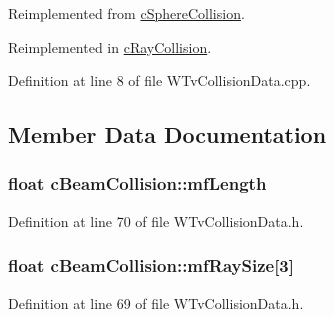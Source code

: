 Reimplemented from \hyperlink{classc_sphere_collision_a98daa58acea17db6bcd4a47239521016}{cSphereCollision}.



Reimplemented in \hyperlink{classc_ray_collision_a6a1bc84fd74b13f41160423c50b61575}{cRayCollision}.



Definition at line 8 of file WTvCollisionData.cpp.



\subsection{Member Data Documentation}
\hypertarget{classc_beam_collision_a263cf00906d1a6d1694687c912b21bb5}{
\subsubsection[{mfLength}]{\setlength{\rightskip}{0pt plus 5cm}float {\bf cBeamCollision::mfLength}}}
\label{classc_beam_collision_a263cf00906d1a6d1694687c912b21bb5}


Definition at line 70 of file WTvCollisionData.h.

\hypertarget{classc_beam_collision_a5f939ccb734d91c482e1c13099c5b461}{
\subsubsection[{mfRaySize}]{\setlength{\rightskip}{0pt plus 5cm}float {\bf cBeamCollision::mfRaySize}\mbox{[}3\mbox{]}}}
\label{classc_beam_collision_a5f939ccb734d91c482e1c13099c5b461}


Definition at line 69 of file WTvCollisionData.h.

